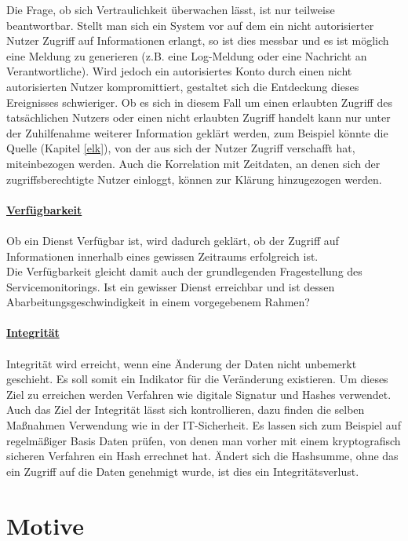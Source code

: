 Die Frage, ob sich Vertraulichkeit überwachen lässt, ist nur teilweise beantwortbar.
Stellt man sich ein System vor auf dem ein nicht autorisierter Nutzer Zugriff auf
Informationen erlangt, so ist dies messbar und es ist möglich eine Meldung 
zu generieren (z.B. eine Log-Meldung oder eine Nachricht an Verantwortliche). Wird 
jedoch ein autorisiertes Konto durch einen nicht autorisierten Nutzer kompromittiert,
gestaltet sich die Entdeckung dieses Ereignisses schwieriger. Ob es sich in diesem Fall 
um einen erlaubten Zugriff des tatsächlichen Nutzers oder einen nicht erlaubten Zugriff
handelt kann nur unter der Zuhilfenahme weiterer Information geklärt werden,
zum Beispiel könnte die Quelle (Kapitel \ref{elk}), von der aus sich der Nutzer Zugriff 
verschafft hat,
miteinbezogen werden. Auch die Korrelation mit Zeitdaten, an denen sich der 
zugriffsberechtigte Nutzer einloggt, können zur Klärung hinzugezogen werden.\\\\

\underline{\textbf{Verfügbarkeit}}\\\\
Ob ein Dienst Verfügbar ist, wird dadurch geklärt, ob der Zugriff auf Informationen
innerhalb eines gewissen Zeitraums erfolgreich ist.\\

Die Verfügbarkeit gleicht damit auch der grundlegenden Fragestellung des 
Servicemonitorings. Ist ein gewisser Dienst erreichbar und ist dessen 
Abarbeitungsgeschwindigkeit in einem vorgegebenem Rahmen?\\\\

\newpage
\underline{\textbf{Integrität}}\\\\
Integrität wird erreicht, wenn eine Änderung der Daten nicht unbemerkt geschieht. Es soll 
somit ein Indikator für die Veränderung existieren. Um dieses Ziel zu erreichen werden
Verfahren wie digitale Signatur und Hashes verwendet.\\

Auch das Ziel der Integrität lässt sich kontrollieren, dazu finden die selben Maßnahmen 
Verwendung wie in der IT-Sicherheit. Es lassen sich zum Beispiel auf regelmäßiger Basis 
Daten prüfen, von denen man vorher mit einem kryptografisch sicheren Verfahren ein Hash 
errechnet hat. Ändert sich die Hashsumme, ohne das ein Zugriff auf die Daten genehmigt 
wurde, ist dies ein Integritätsverlust.
 
\section{Motive}

